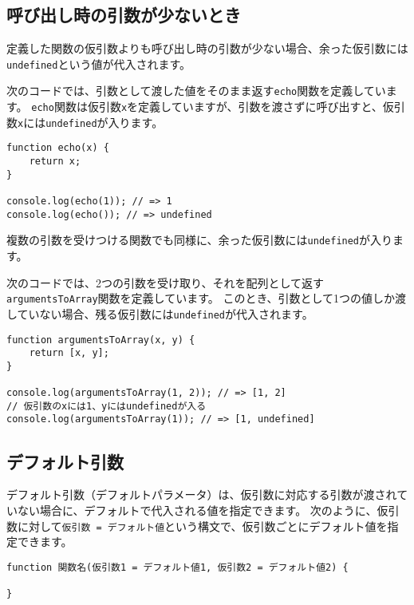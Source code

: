 \hypertarget{function-less-arguments}{%
\subsection{呼び出し時の引数が少ないとき}\label{function-less-arguments}}

定義した関数の仮引数よりも呼び出し時の引数が少ない場合、余った仮引数には\texttt{undefined}という値が代入されます。

次のコードでは、引数として渡した値をそのまま返す\texttt{echo}関数を定義しています。
\texttt{echo}関数は仮引数\texttt{x}を定義していますが、引数を渡さずに呼び出すと、仮引数\texttt{x}には\texttt{undefined}が入ります。

\begin{lstlisting}
function echo(x) {
    return x;
}

console.log(echo(1)); // => 1
console.log(echo()); // => undefined
\end{lstlisting}

複数の引数を受けつける関数でも同様に、余った仮引数には\texttt{undefined}が入ります。

次のコードでは、2つの引数を受け取り、それを配列として返す\texttt{argumentsToArray}関数を定義しています。
このとき、引数として1つの値しか渡していない場合、残る仮引数には\texttt{undefined}が代入されます。

\begin{lstlisting}
function argumentsToArray(x, y) {
    return [x, y];
}

console.log(argumentsToArray(1, 2)); // => [1, 2]
// 仮引数のxには1、yにはundefinedが入る
console.log(argumentsToArray(1)); // => [1, undefined]
\end{lstlisting}

\hypertarget{function-default-parameters}{%
\subsection[デフォルト引数]{デフォルト引数\,\protect{}}\label{function-default-parameters}}

デフォルト引数（デフォルトパラメータ）は、仮引数に対応する引数が渡されていない場合に、デフォルトで代入される値を指定できます。
次のように、仮引数に対して\texttt{仮引数 = デフォルト値}という構文で、仮引数ごとにデフォルト値を指定できます。

\begin{lstlisting}
function 関数名(仮引数1 = デフォルト値1, 仮引数2 = デフォルト値2) {

}
\end{lstlisting}

